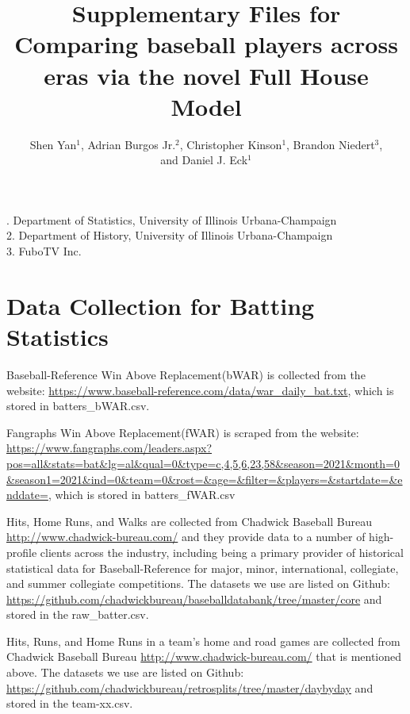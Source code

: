 \documentclass{article}
\title{Supplementary Files for Comparing baseball players across eras via the novel Full House Model}
\author{Shen Yan$^1$, Adrian Burgos Jr.$^2$, Christopher Kinson$^1$, Brandon Niedert$^3$, \\and Daniel J. Eck$^1$}
\date{}
\begin{document}
\maketitle

{. Department of Statistics, University of Illinois Urbana-Champaign \\
2. Department of History, University of Illinois Urbana-Champaign \\
3. FuboTV Inc. \\}

\vspace*{0.25cm}

\section{Data Collection for Batting Statistics}

Baseball-Reference Win Above Replacement(bWAR) is collected from the website: \url{https://www.baseball-reference.com/data/war_daily_bat.txt}, which is stored in batters\_bWAR.csv. 

\bigskip

Fangraphs Win Above Replacement(fWAR) is scraped from the website: \url {https://www.fangraphs.com/leaders.aspx?pos=all&stats=bat&lg=al&qual=0&type=c,4,5,6,23,58&season=2021&month=0&season1=2021&ind=0&team=0&rost=&age=&filter=&players=&startdate=&enddate=}, which is stored in batters\_fWAR.csv

\bigskip

Hits, Home Runs, and Walks are collected from Chadwick Baseball Bureau \url{http://www.chadwick-bureau.com/} and they provide data to a number of high-profile clients across the industry, including being a primary provider of historical statistical data for Baseball-Reference for major, minor, international, collegiate, and summer collegiate competitions. The datasets we use are listed on Github: \url{https://github.com/chadwickbureau/baseballdatabank/tree/master/core} and stored in the raw\_batter.csv.



\bigskip

Hits, Runs, and Home Runs in a team's home and road games are collected from Chadwick Baseball Bureau \url{http://www.chadwick-bureau.com/} that is mentioned above. The datasets we use are listed on Github: \url{https://github.com/chadwickbureau/retrosplits/tree/master/daybyday} and stored in the team-xx.csv. 
\end{document}
